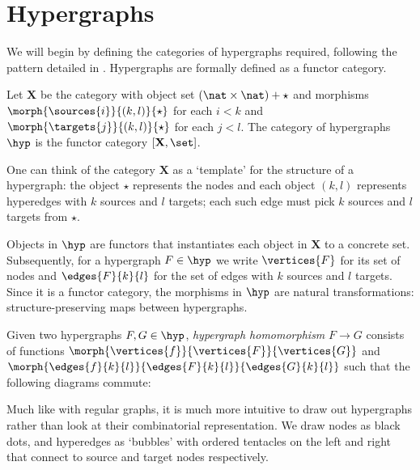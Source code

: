 \section{Hypergraphs}

We will begin by defining the categories of hypergraphs required, following the
pattern detailed in \cite{bonchi2022string}.
Hypergraphs are formally defined as a functor category.

\begin{definition}
    Let \(\mathbf{X}\) be the category with object set
    \((\nat \times \nat) + \star\) and morphisms
    \(\morph{\sources{i}}{(k,l)}{\star}\) for each \(i < k\)
    and \(\morph{\targets{j}}{(k,l)}{\star}\) for each \(j < l\).
    The category of hypergraphs \(\hyp\) is the functor category
    \([\mathbf{X}, \set]\).
\end{definition}

One can think of the category \(\mathbf{X}\) as a `template' for the structure
of a hypergraph: the object \(\star\) represents the nodes and each object
\((k, l)\) represents hyperedges with \(k\) sources and \(l\) targets; each such
edge must pick \(k\) sources and \(l\) targets from \(\star\).

Objects in \(\hyp\) are functors that instantiates each object in \(\mathbf{X}\)
to a concrete set.
Subsequently, for a hypergraph \(F \in \hyp\) we write \(\vertices{F}\) for its
set of nodes and \(\edges{F}{k}{l}\) for the set of edges with \(k\) sources and
\(l\) targets.
Since it is a functor category, the morphisms in \(\hyp\) are natural
transformations: structure-preserving maps between hypergraphs.

\begin{definition}
    Given two hypergraphs \(F, G \in \hyp\), \emph{hypergraph homomorphism}
    \(F \to G\) consists of functions
    \(\morph{\vertices{f}}{\vertices{F}}{\vertices{G}}\) and
    \(\morph{\edges{f}{k}{l}}{\edges{F}{k}{l}}{\edges{G}{k}{l}}\) such that the
    following diagrams commute:
    
\end{definition}

Much like with regular graphs, it is much more intuitive to draw out hypergraphs
rather than look at their combinatorial representation.
We draw nodes as black dots, and hyperedges as `bubbles' with ordered tentacles
on the left and right that connect to source and target nodes respectively.

\begin{example}
\end{example}

